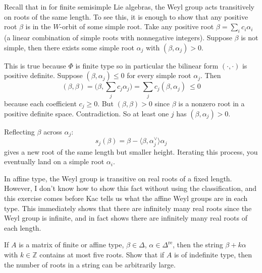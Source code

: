 \documentclass[12pt]{article}
\begin{document}
\begin{remark}
    Recall that in for finite semisimple Lie algebras, the Weyl group acts transitively on roots of the same length. To see this, it is enough to show that any positive root $\beta$ is in the $W$-orbit of some simple root. Take any positive root $\beta=\sum_i c_i\alpha_i$ (a linear combination of simple roots with nonnegative integers). 
Suppose $\beta$ is not simple, then there exists some simple root $\alpha_j$ with $(\beta,\alpha_j)>0$.

This is true because $\Phi$ is finite type so in particular the bilinear form $(\cdot,\cdot)$ is positive definite.
Suppose $(\beta,\alpha_j)\leq 0$ for every simple root $\alpha_j$. Then
\[
(\beta,\beta) = \Big(\beta,\sum_j c_j\alpha_j\Big) = \sum_j c_j(\beta,\alpha_j)\ \leq 0
\]
because each coefficient $c_j\geq 0$. But $(\beta,\beta)>0$ since $\beta$ is a nonzero root in a positive definite space. Contradiction. So at least one $j$ has $(\beta,\alpha_j)>0$.

Reflecting $\beta$ across $\alpha_j$:
\[
s_j(\beta) = \beta - \langle \beta,\alpha_j^\vee\rangle\alpha_j
\]
gives a new root of the same length but smaller height. Iterating this process, you eventually land on a simple root $\alpha_i$.

In affine type, the Weyl group is transitive on real roots of a fixed length. However, I don't know how to show this fact without using the classification, and this exercise comes before Kac tells us what the affine Weyl groups are in each type. This immediately shows that there are infinitely many real roots since the Weyl group is infinite, and in fact shows there are infinitely many real roots of each length. 
\end{remark}

\begin{exercise}
    If $A$ is a matrix of finite or affine type, $\beta \in \Delta$, $\alpha \in \Delta^{\mathrm{re}}$, then the string $\beta + k \alpha$ with $k \in \mathbb{Z}$ contains at most five roots. Show that if $A$ is of indefinite type, then the number of roots in a string can be arbitrarily large.
\end{exercise}
\end{document}
